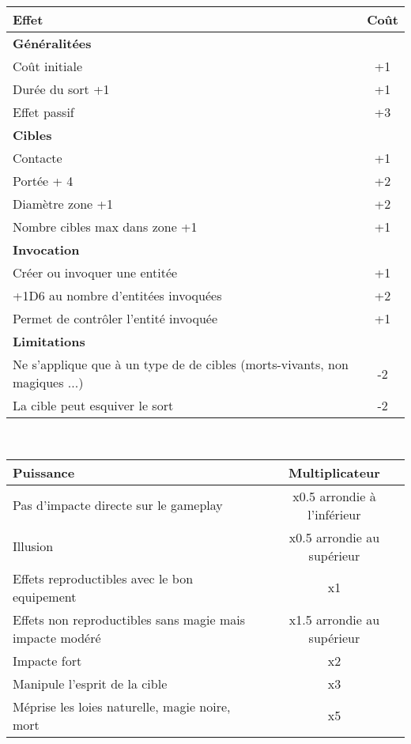 \documentclass[11pt]{article} %
\newcommand{\myjump}[1][1]{\mbox{}\\[#1cm]}
\begin{document}
\noindent
\begin{tabularx}{\linewidth}{|Xc|}
\hline

    \textbf{Effet} & \textbf{Coût}\\
    \hline
    \textbf{Généralitées} &\\
    Coût initiale & +1\\
    Durée du sort +1 & +1\\
    Effet passif & +3\\
    \hline
    \textbf{Cibles} &\\
    Contacte & +1\\
    Portée + 4 & +2\\
    Diamètre zone +1 & +2\\
    Nombre cibles max dans zone +1 & +1\\
    \hline
    \textbf{Invocation} &\\
    Créer ou invoquer une entitée & +1\\
    +1D6 au nombre d'entitées invoquées & +2\\
    Permet de contrôler l'entité invoquée & +1\\
    \hline
    \textbf{Limitations} &\\
    Ne s'applique que à un type de de cibles (morts-vivants, non magiques ...) & -2\\
    La cible peut esquiver le sort & -2\\


\hline
\end{tabularx}

\myjump[0.35]\noindent
\begin{tabularx}{\linewidth}{|Xc|}
\hline

    \textbf{Puissance} & \textbf{Multiplicateur}\\
    \hline
    Pas d'impacte directe sur le gameplay & x0.5 arrondie à l'inférieur\\
    Illusion & x0.5 arrondie au supérieur\\
    Effets reproductibles avec le bon equipement & x1\\
    Effets non reproductibles sans magie mais impacte modéré & x1.5 arrondie au supérieur\\
    Impacte fort & x2\\
    Manipule l'esprit de la cible & x3\\
    Méprise les loies naturelle, magie noire, mort & x5\\


\hline
\end{tabularx}
\end{document}
